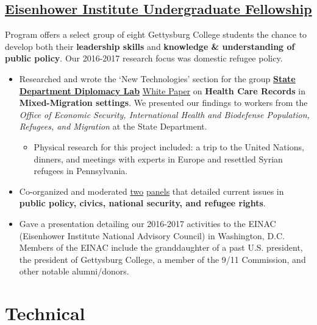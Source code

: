 \documentclass[11pt]{article}
\begin{document}
\subsection*{\underline{Eisenhower Institute Undergraduate Fellowship}} 
Program offers a select group of eight Gettysburg College students the chance to develop both their \textbf{leadership skills} and \textbf{knowledge \& understanding of public policy}. Our 2016-2017 research focus was domestic refugee policy.
\begin{itemize}
\item Researched and wrote the `New Technologies' section for the group \href{https://www.state.gov/s/partnerships/ppp/diplab/}{\textbf{State Department Diplomacy Lab}} \href{https://drive.google.com/file/d/0B5fjh9FZOHSYT1dhVF8yYmd4UEk/view?usp=sharing}{White Paper} on \textbf{Health Care Records} in \textbf{Mixed-Migration settings}. We presented our findings to workers from the \textit{Office of Economic Security, International Health and Biodefense Population, Refugees, and Migration} at the State Department. 
\begin{itemize}
\item Physical research for this project included: a trip to the United Nations, dinners, and meetings with experts in Europe and resettled Syrian refugees in Pennsylvania.
\end{itemize}
\item Co-organized and moderated \href{http://cs.gettysburg.edu/~duncjo01/assets/media/EI_panel_f16.pdf}{two} \href{http://cs.gettysburg.edu/~duncjo01/assets/media/EI_panel_s17_second.pdf}{panels} that detailed current issues in \textbf{public policy, civics, national security, and refugee rights}. 
\item Gave a presentation detailing our 2016-2017 activities to the EINAC (Eisenhower Institute National Advisory Council) in Washington, D.C. Members of the EINAC include the granddaughter of a past U.S. president, the president of Gettysburg College, a member of the 9/11 Commission, and other notable alumni/donors.
\end{itemize}

\section*{Technical}
\end{document}
